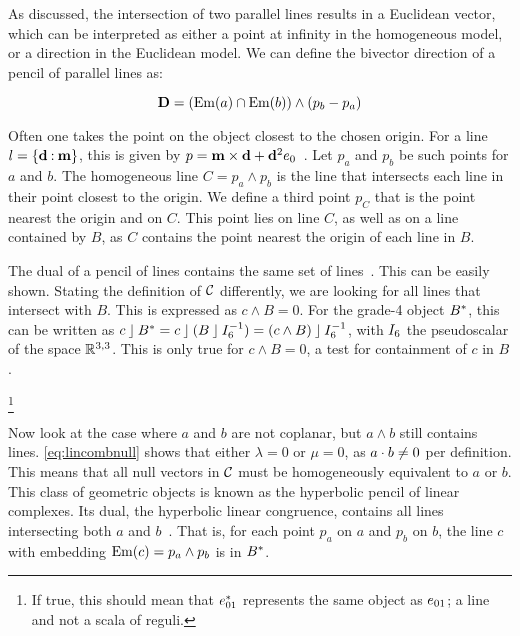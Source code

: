 As discussed, the intersection of two parallel lines results in a Euclidean vector, which can be interpreted as either a point at infinity in the homogeneous model, or a direction in the Euclidean model.  We can define the bivector direction of a pencil of parallel lines as:

\begin{equation*}
  \mathbf{D} = \left(\operatorname{Em}(a) \cap \operatorname{Em}(b)\right) \wedge \left(p_b - p_a\right)
\end{equation*}

Often one takes the point on the object closest to the chosen origin.  For a line $l = \{\mathbf{d} \mathbin{:} \mathbf{m}\}$, this is given by $p = \mathbf{m} \times \mathbf{d} + \mathbf{d}^2 e_0$~\cite{Shoemake}.  Let $p_a$ and $p_b$ be such points for $a$ and $b$.  The homogeneous line $C = p_a \wedge p_b$ is the line that intersects each line in their point closest to the origin.  We define a third point $p_C$ that is the point nearest the origin and on $C$.  This point lies on line $C$, as well as on a line contained by $B$, as $C$ contains the point nearest the origin of each line in $B$.

The dual of a pencil of lines contains the same set of lines~\cite[Section 3.2.1]{Pottmann}.  This can be easily shown.  Stating the definition of $\mathcal{C}$ differently, we are looking for all lines that intersect with $B$.  This is expressed as $c \wedge B = 0$.  For the grade-4 object $B^\ast$, this can be written as $c \mathbin{\rfloor} B^\ast = c \mathbin{\rfloor} (B \mathbin{\rfloor} I_6^{-1}) = (c \wedge B) \mathbin{\rfloor} I_6^{-1}$, with $I_6$ the pseudoscalar of the space $\mathbb{R}^{3,3}$.  This is only true for $c \wedge B = 0$, a test for containment of $c$ in $B$.

\footnote{If true, this should mean that $e_{01}^\ast$ represents the same object as $e_{01}$; a line and not a scala of reguli.}

Now look at the case where $a$ and $b$ are not coplanar, but $a \wedge b$ still contains lines.  \autoref{eq:lincombnull} shows that either $\lambda = 0$ or $\mu = 0$, as $a \mathbin{\cdot} b \not= 0$ per definition.  This means that all null vectors in $\mathcal{C}$ must be homogeneously equivalent to $a$ or $b$.  This class of geometric objects is known as the hyperbolic pencil of linear complexes.  Its dual, the hyperbolic linear congruence, contains all lines intersecting both $a$ and $b$~\cite[Proposition 3.2.3]{Pottmann}. That is, for each point $p_a$ on $a$ and $p_b$ on $b$, the line $c$ with embedding $\operatorname{Em}(c) = p_a \wedge p_b$ is in $B^\ast$.  

